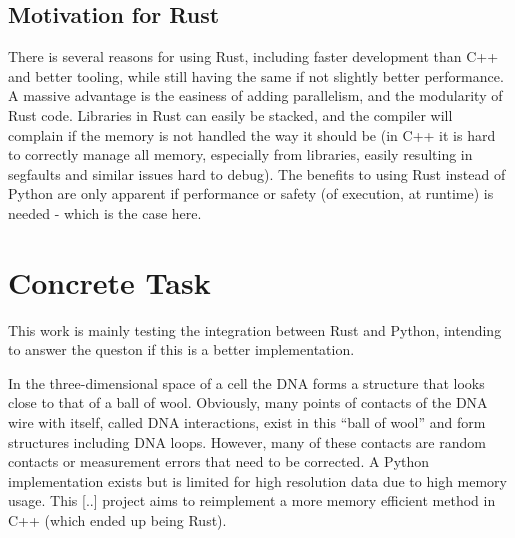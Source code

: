 \subsection{Motivation for Rust}

There is several reasons for using Rust, including faster development than C++
and better tooling, while still having the same if not slightly better
performance. A massive advantage is the easiness of adding parallelism, and the
modularity of Rust code. Libraries in Rust can easily be stacked, and the
compiler will complain if the memory is not handled the way it should be (in
C++ it is hard to correctly manage all memory, especially from libraries,
easily resulting in segfaults and similar issues hard to debug). The benefits to
using Rust instead of Python are only apparent if performance or safety (of
execution, at runtime) is needed - which is the case here.






\section{Concrete Task}


This work is mainly testing the integration between Rust and Python, intending
to answer the queston if this is a better implementation.

In the three-dimensional space of a cell the DNA forms a structure that looks
close to that of a ball of wool. Obviously, many points of contacts of the DNA
wire with itself, called DNA interactions, exist in this ``ball of wool'' and
form structures including DNA loops. However, many of these contacts are
random contacts or measurement errors that need to be corrected. A Python
implementation exists but is limited for high resolution data due to high
memory usage. This [..] project aims to reimplement a more memory efficient
method in C++ (which ended up being Rust).



